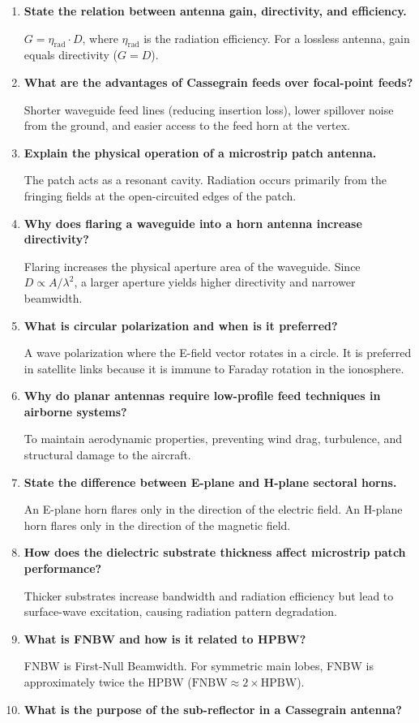 \documentclass[12pt,a4paper]{article}
\newcommand{\Q}[1]{\textbf{#1}\par\noindent\ignorespaces}
\begin{document}
\begin{tcolorbox}[exambox, title={\textbf{Frequently Asked / Viva Questions}}]
\begin{enumerate}[topsep=0pt, label=\textbf{Q\arabic*.}, itemsep=5pt]
  \item \Q{State the relation between antenna gain, directivity, and efficiency.}
    $G = \eta_{\text{rad}} \cdot D$, where $\eta_{\text{rad}}$ is the radiation efficiency. For a lossless antenna, gain equals directivity ($G = D$).
  \item \Q{What are the advantages of Cassegrain feeds over focal-point feeds?}
    Shorter waveguide feed lines (reducing insertion loss), lower spillover noise from the ground, and easier access to the feed horn at the vertex.
  \item \Q{Explain the physical operation of a microstrip patch antenna.}
    The patch acts as a resonant cavity. Radiation occurs primarily from the fringing fields at the open-circuited edges of the patch.
  \item \Q{Why does flaring a waveguide into a horn antenna increase directivity?}
    Flaring increases the physical aperture area of the waveguide. Since $D \propto A/\lambda^2$, a larger aperture yields higher directivity and narrower beamwidth.
  \item \Q{What is circular polarization and when is it preferred?}
    A wave polarization where the E-field vector rotates in a circle. It is preferred in satellite links because it is immune to Faraday rotation in the ionosphere.
  \item \Q{Why do planar antennas require low-profile feed techniques in airborne systems?}
    To maintain aerodynamic properties, preventing wind drag, turbulence, and structural damage to the aircraft.
  \item \Q{State the difference between E-plane and H-plane sectoral horns.}
    An E-plane horn flares only in the direction of the electric field. An H-plane horn flares only in the direction of the magnetic field.
  \item \Q{How does the dielectric substrate thickness affect microstrip patch performance?}
    Thicker substrates increase bandwidth and radiation efficiency but lead to surface-wave excitation, causing radiation pattern degradation.
  \item \Q{What is FNBW and how is it related to HPBW?}
    FNBW is First-Null Beamwidth. For symmetric main lobes, FNBW is approximately twice the HPBW ($\text{FNBW} \approx 2 \times \text{HPBW}$).
  \item \Q{What is the purpose of the sub-reflector in a Cassegrain antenna?}

\end{enumerate}
\end{tcolorbox}
\end{document}
